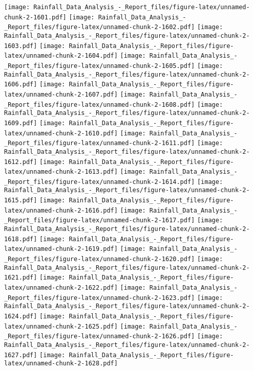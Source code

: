 \documentclass[
]{article}
\begin{document}
\texttt{[image: Rainfall\_Data\_Analysis\_-\_Report\_files/figure-latex/unnamed-chunk-2-1601.pdf]}
\texttt{[image: Rainfall\_Data\_Analysis\_-\_Report\_files/figure-latex/unnamed-chunk-2-1602.pdf]}
\texttt{[image: Rainfall\_Data\_Analysis\_-\_Report\_files/figure-latex/unnamed-chunk-2-1603.pdf]}
\texttt{[image: Rainfall\_Data\_Analysis\_-\_Report\_files/figure-latex/unnamed-chunk-2-1604.pdf]}
\texttt{[image: Rainfall\_Data\_Analysis\_-\_Report\_files/figure-latex/unnamed-chunk-2-1605.pdf]}
\texttt{[image: Rainfall\_Data\_Analysis\_-\_Report\_files/figure-latex/unnamed-chunk-2-1606.pdf]}
\texttt{[image: Rainfall\_Data\_Analysis\_-\_Report\_files/figure-latex/unnamed-chunk-2-1607.pdf]}
\texttt{[image: Rainfall\_Data\_Analysis\_-\_Report\_files/figure-latex/unnamed-chunk-2-1608.pdf]}
\texttt{[image: Rainfall\_Data\_Analysis\_-\_Report\_files/figure-latex/unnamed-chunk-2-1609.pdf]}
\texttt{[image: Rainfall\_Data\_Analysis\_-\_Report\_files/figure-latex/unnamed-chunk-2-1610.pdf]}
\texttt{[image: Rainfall\_Data\_Analysis\_-\_Report\_files/figure-latex/unnamed-chunk-2-1611.pdf]}
\texttt{[image: Rainfall\_Data\_Analysis\_-\_Report\_files/figure-latex/unnamed-chunk-2-1612.pdf]}
\texttt{[image: Rainfall\_Data\_Analysis\_-\_Report\_files/figure-latex/unnamed-chunk-2-1613.pdf]}
\texttt{[image: Rainfall\_Data\_Analysis\_-\_Report\_files/figure-latex/unnamed-chunk-2-1614.pdf]}
\texttt{[image: Rainfall\_Data\_Analysis\_-\_Report\_files/figure-latex/unnamed-chunk-2-1615.pdf]}
\texttt{[image: Rainfall\_Data\_Analysis\_-\_Report\_files/figure-latex/unnamed-chunk-2-1616.pdf]}
\texttt{[image: Rainfall\_Data\_Analysis\_-\_Report\_files/figure-latex/unnamed-chunk-2-1617.pdf]}
\texttt{[image: Rainfall\_Data\_Analysis\_-\_Report\_files/figure-latex/unnamed-chunk-2-1618.pdf]}
\texttt{[image: Rainfall\_Data\_Analysis\_-\_Report\_files/figure-latex/unnamed-chunk-2-1619.pdf]}
\texttt{[image: Rainfall\_Data\_Analysis\_-\_Report\_files/figure-latex/unnamed-chunk-2-1620.pdf]}
\texttt{[image: Rainfall\_Data\_Analysis\_-\_Report\_files/figure-latex/unnamed-chunk-2-1621.pdf]}
\texttt{[image: Rainfall\_Data\_Analysis\_-\_Report\_files/figure-latex/unnamed-chunk-2-1622.pdf]}
\texttt{[image: Rainfall\_Data\_Analysis\_-\_Report\_files/figure-latex/unnamed-chunk-2-1623.pdf]}
\texttt{[image: Rainfall\_Data\_Analysis\_-\_Report\_files/figure-latex/unnamed-chunk-2-1624.pdf]}
\texttt{[image: Rainfall\_Data\_Analysis\_-\_Report\_files/figure-latex/unnamed-chunk-2-1625.pdf]}
\texttt{[image: Rainfall\_Data\_Analysis\_-\_Report\_files/figure-latex/unnamed-chunk-2-1626.pdf]}
\texttt{[image: Rainfall\_Data\_Analysis\_-\_Report\_files/figure-latex/unnamed-chunk-2-1627.pdf]}
\texttt{[image: Rainfall\_Data\_Analysis\_-\_Report\_files/figure-latex/unnamed-chunk-2-1628.pdf]}
\end{document}
